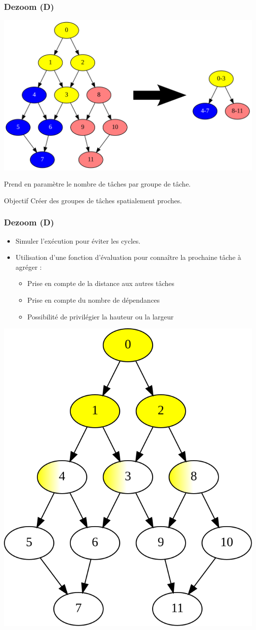 \documentclass{beamer}
\begin{document}
\begin{frame}
  \frametitle{Dezoom (D)}

  \centerline{\includegraphics[width=0.75\linewidth]{algo_D4}}

  \bigskip

  Prend en paramètre le nombre de tâches par groupe de tâche.

  \bigskip

  \begin{block}{Objectif}
    Créer des groupes de tâches spatialement proches.
  \end{block}
\end{frame}


\begin{frame}
  \frametitle{Dezoom (D)}

  \begin{itemize}
    \item Simuler l'exécution pour éviter les cycles.
    \item Utilisation d'une fonction d'évaluation pour connaître la prochaine tâche à agréger :
    \begin{itemize}
      \item Prise en compte de la distance aux autres tâches
      \item Prise en compte du nombre de dépendances
      \item Possibilité de privilégier la hauteur ou la largeur
    \end{itemize}
  \end{itemize}

  \centerline{\includegraphics[width=0.35\linewidth]{algo_D_ongoing}}

\end{frame}
\end{document}
